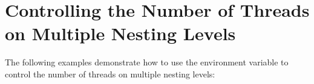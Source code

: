 \pagebreak
\section{Controlling the Number of Threads on Multiple Nesting Levels}
\label{sec:nthrs_nesting}

The following examples demonstrate how to use the  environment 
variable  to control the number of threads on multiple nesting levels:




